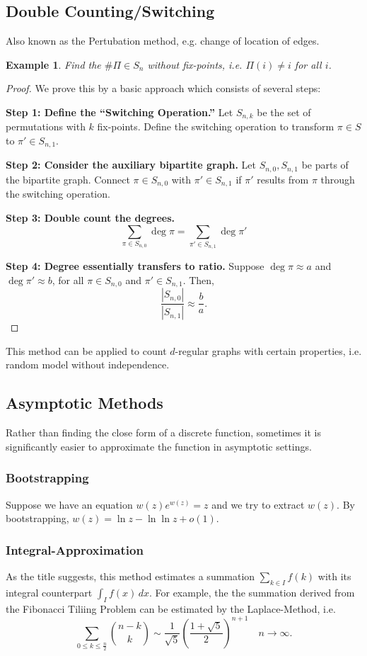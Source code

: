 \documentclass[a4paper]{article}
\newtheorem{example}[theorem]{Example}
\begin{document}
\subsection*{Double Counting/Switching}

Also known as the Pertubation method, e.g. change of location of edges.

\begin{example}
  Find the $\# \Pi \in S_n$ without fix-points, i.e. $\Pi(i) \neq i$ for all $i$.
\end{example}

\begin{proof}
  We prove this by a basic approach which consists of several steps:

  \textbf{Step 1: Define the ``Switching Operation.''} Let $S_{n, k}$ be the set of permutations
  with $k$ fix-points. Define the switching operation to transform $\pi \in S$ to $\pi' \in S_{n,
  1}$.

  \textbf{Step 2: Consider the auxiliary bipartite graph.} Let $S_{n, 0}, S_{n, 1}$ be parts of
  the bipartite graph. Connect $\pi \in S_{n, 0}$ with $\pi' \in S_{n, 1}$ if $\pi'$ results from
  $\pi$ through the switching operation.

  \textbf{Step 3: Double count the degrees.}
  \[
    \sum_{\pi \in S_{n, 0}} \deg \pi = \sum_{\pi' \in S_{n, 1}} \deg \pi'
  \]

  \textbf{Step 4: Degree essentially transfers to ratio.} Suppose $\deg \pi \approx a$ and $\deg
  \pi' \approx b$, for all $\pi \in S_{n, 0}$ and $\pi' \in S_{n, 1}$. Then,
  \[
    \frac{|S_{n, 0}|}{|S_{n, 1}|} \approx \frac{b}{a}.
  \]
\end{proof}

This method can be applied to count $d$-regular graphs with certain properties, i.e. random model
without independence.

\subsection*{Asymptotic Methods}

Rather than finding the close form of a discrete function, sometimes it is significantly easier to
approximate the function in asymptotic settings.

\subsubsection*{Bootstrapping}

Suppose we have an equation $w(z)e^{w(z)} = z$ and we try to extract $w(z)$. By bootstrapping, $w(z)
= \ln z - \ln \ln z + o(1)$.

\subsubsection*{Integral-Approximation}

As the title suggests, this method estimates a summation $\sum_{k \in I} f(k)$ with its integral
counterpart $\int_I f(x) \, dx$. For example, the the summation derived from the Fibonacci Tiliing
Problem can be estimated by the Laplace-Method, i.e.
\[
  \sum_{0 \leq k \leq \frac{n}{2}} \binom{n - k}{k} \sim \frac{1}{\sqrt{5}}\left(\frac{1 + \sqrt{5}}{2}\right)^{n + 1} \quad n \to \infty.
\]
\end{document}
